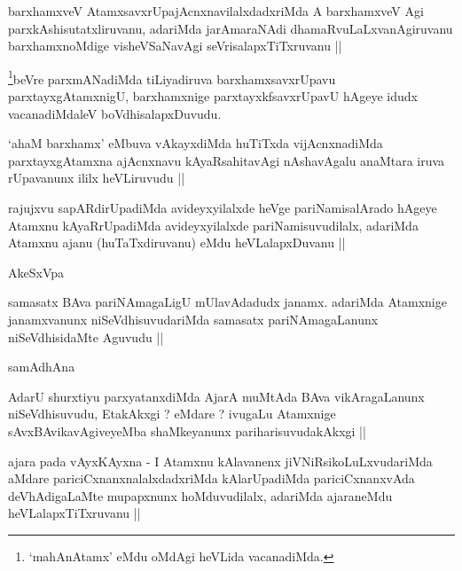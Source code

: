 \begin{artha}
barxhamxveV AtamxsavxrUpajAcnxnavilalxdadxriMda A barxhamxveV Agi parxkAshisutatxliruvanu, adariMda jarAmaraNAdi dhamaRvuLaLxvanAgiruvanu barxhamxnoMdige visheVSaNavAgi seVrisalapxTiTxruvanu ||
\end{artha}


\begin{artha}
\footnote{`mahAnAtamx' eMdu oMdAgi heVLida vacanadiMda.}beVre parxmANadiMda tiLiyadiruva barxhamxsavxrUpavu parxtayxgAtamxnigU, barxhamxnige parxtayxkfsavxrUpavU hAgeye idudx vacanadiMdaleV boVdhisalapxDuvudu.
\end{artha}


\begin{artha}
`ahaM barxhamx' eMbuva vAkayxdiMda huTiTxda vijAcnxnadiMda parxtayxgAtamxna ajAcnxnavu kAyaRsahitavAgi nAshavAgalu anaMtara iruva rUpavanunx ililx heVLiruvudu ||
\end{artha}

\begin{artha}
rajujxvu sapARdirUpadiMda avideyxyilalxde heVge pariNamisalArado hAgeye Atamxnu kAyaRrUpadiMda avideyxyilalxde pariNamisuvudilalx, adariMda Atamxnu ajanu (huTaTxdiruvanu) eMdu heVLalapxDuvanu ||
\end{artha}

\begin{artha}
AkeSxVpa
\end{artha}

\begin{artha}
samasatx BAva pariNAmagaLigU mUlavAdadudx janamx. adariMda Atamxnige janamxvanunx niSeVdhisuvudariMda samasatx pariNAmagaLanunx niSeVdhisidaMte Aguvudu ||
\end{artha}

\begin{artha}
samAdhAna
\end{artha}

\begin{artha}
AdarU shurxtiyu parxyatanxdiMda AjarA muMtAda BAva vikAragaLanunx niSeVdhisuvudu, EtakAkxgi ? eMdare ? ivugaLu Atamxnige sAvxBAvikavAgiveyeMba shaMkeyanunx pariharisuvudakAkxgi ||
\end{artha}


\begin{artha}
ajara pada vAyxKAyxna - I Atamxnu kAlavanenx jiVNiRsikoLuLxvudariMda aMdare pariciCxnanxnalalxdadxriMda kAlarUpadiMda pariciCxnanxvAda deVhAdigaLaMte mupapxnunx hoMduvudilalx, adariMda ajaraneMdu heVLalapxTiTxruvanu ||
\end{artha}

